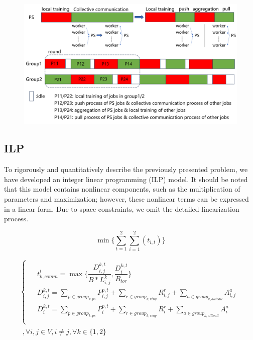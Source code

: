 \documentclass[conference]{IEEEtran}
\begin{document}
\begin{figure}
	\centering
	\includegraphics[width=1\linewidth]{figure/picture6}
	\caption{}
	\label{fig:picture6}
\end{figure}

\subsection{ILP}


To rigorously and quantitatively describe the previously presented problem, we have developed an integer linear programming (ILP) model. It should be noted that this model contains nonlinear components, such as the multiplication of parameters and maximization; however, these nonlinear terms can be expressed in a linear form. Due to space constraints, we omit the detailed linearization process.

\begin{equation}
	\min\{\sum_{t=1}^{2}\sum_{i=1}^{2}(t_{i,t})\}
\end{equation}

\begin{equation}
	\begin{split}
		\begin{cases}
			\begin{aligned}
				& t_{k, comm}^{t} = \max\{\dfrac{D^{k, t}_{i,j}}{B * L^k_{i,j}}, \dfrac{D_i^{k, t}}{B_{tor}}\}\\
				& D^{k, t}_{i,j} = \sum_{p\in group_{k, ps}}P^{p,t}_{i,j} + \sum_{r\in group_{k, ring}}R^{r}_{i,j} + \sum_{a\in group_{k,alltoall}}A^{a}_{i,j}\\
				& D^{k, t}_i = \sum_{p\in group_{k, ps}}P^{p,t}_{i} + \sum_{r\in group_{k, ring}}R^{r}_{i} + \sum_{a\in group_{k,alltoall}}A^{a}_{i}\\
			\end{aligned}
		\end{cases}\\
		\begin{aligned}
			, \forall i, j\in V, i \neq j, \forall k\in \{1,2\}\\
		\end{aligned}
	\end{split}
\end{equation}
\end{document}

